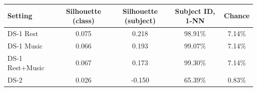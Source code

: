\begin{tabular}{lcccc}
\toprule
Setting & Silhouette (class) & Silhouette (subject) & Subject ID, 1-NN & Chance\\
\midrule
DS-1 Rest & 0.075 & 0.218 & 98.91\% & 7.14\% \\
DS-1 Music & 0.066 & 0.193 & 99.07\% & 7.14\% \\
DS-1 Rest+Music & 0.067 & 0.173 & 99.30\% & 7.14\% \\
DS-2 & 0.026 & -0.150 & 65.39\% & 0.83\% \\
\bottomrule
\end{tabular}
